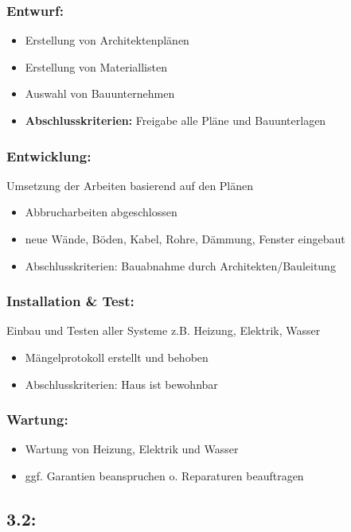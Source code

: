 \subsubsection*{Entwurf:}
\begin{itemize}
\item Erstellung von Architektenplänen
\item Erstellung von Materiallisten
\item Auswahl von Bauunternehmen
\item \textbf{Abschlusskriterien:} Freigabe alle Pläne und Bauunterlagen
\end{itemize}

\subsubsection*{Entwicklung:}
Umsetzung der Arbeiten basierend auf den Plänen
\begin{itemize}
\item Abbrucharbeiten abgeschlossen
\item neue Wände, Böden, Kabel, Rohre, Dämmung, Fenster eingebaut
\item Abschlusskriterien: Bauabnahme durch Architekten/Bauleitung
\end{itemize}

\subsubsection*{Installation \& Test:}
Einbau und Testen aller Systeme z.B. Heizung, Elektrik, Wasser
\begin{itemize}
\item Mängelprotokoll erstellt und behoben
\item Abschlusskriterien: Haus ist bewohnbar
\end{itemize}

\subsubsection*{Wartung:}
\begin{itemize}
\item Wartung von Heizung, Elektrik und Wasser
\item ggf. Garantien beanspruchen o. Reparaturen beauftragen
\end{itemize}

\subsection*{3.2:}

